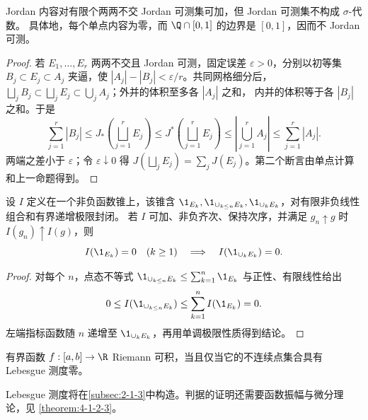 \begin{proposition}\label{proposition:2-1-1-3}
Jordan 内容对有限个两两不交 Jordan 可测集可加，但 Jordan 可测集不构成 $\sigma$-代数。
具体地，每个单点内容为零，而 $\Q\cap[0,1]$ 的边界是 $[0,1]$，因而不 Jordan 可测。
\end{proposition}

\begin{proof}
若 $E_1,\dots,E_r$ 两两不交且 Jordan 可测，固定误差 $\varepsilon>0$，分别以初等集
$B_j\subset E_j\subset A_j$ 夹逼，使 $|A_j|-|B_j|<\varepsilon/r$。共同网格细分后，
$\bigsqcup_jB_j\subset\bigsqcup_jE_j\subset\bigcup_jA_j$；外并的体积至多各 $|A_j|$ 之和，
内并的体积等于各 $|B_j|$ 之和。于是
\[
 \sum_{j=1}^r|B_j|
 \le J_*\!\left(\bigsqcup_{j=1}^rE_j\right)
 \le J^*\!\left(\bigsqcup_{j=1}^rE_j\right)
 \le\left|\bigcup_{j=1}^rA_j\right|
 \le\sum_{j=1}^r|A_j|.
\]
两端之差小于 $\varepsilon$；令 $\varepsilon\downarrow0$ 得
$J(\bigsqcup_jE_j)=\sum_jJ(E_j)$。第二个断言由单点计算和上一命题得到。
\end{proof}

\begin{proposition}[单调极限迫使零集可数稳定]\label{proposition:2-1-1-4}
设 $I$ 定义在一个非负函数锥上，该锥含
$\1_{E_k},\1_{\cup_{k\le n}E_k},\1_{\cup_kE_k}$，对有限非负线性组合和有界递增极限封闭。
若 $I$ 可加、非负齐次、保持次序，并满足 $g_n\uparrow g$ 时 $I(g_n)\uparrow I(g)$，则
\[
 I(\1_{E_k})=0\quad(k\ge1)
 \quad\Longrightarrow\quad I(\1_{\cup_kE_k})=0.
\]
\end{proposition}

\begin{proof}
对每个 $n$，点态不等式
$\1_{\cup_{k\le n}E_k}\le\sum_{k=1}^n\1_{E_k}$ 与正性、有限线性给出
\[
 0\le I(\1_{\cup_{k\le n}E_k})
 \le\sum_{k=1}^nI(\1_{E_k})=0.
\]
左端指标函数随 $n$ 递增至 $\1_{\cup_kE_k}$，再用单调极限性质得到结论。
\end{proof}

\begin{theorem}\label{theorem:2-1-1-1}
有界函数 $f:[a,b]\to\R$ Riemann 可积，当且仅当它的不连续点集合具有 Lebesgue 测度零。
\end{theorem}

Lebesgue 测度将在\cref{subsec:2-1-3}中构造。判据的证明还需要函数振幅与微分理论，见
\cref{theorem:4-1-2-3}。

